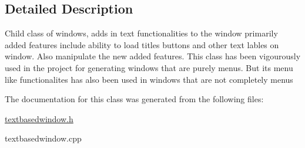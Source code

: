 \subsection{Detailed Description}
Child class of windows, adds in text functionalities to the window primarily added features include ability to load titles buttons and other text lables on window. Also manipulate the new added features. This class has been vigourously used in the project for generating windows that are purely menus. But its menu like functionalites has also been used in windows that are not completely menus 

The documentation for this class was generated from the following files\+:\begin{DoxyCompactItemize}
\item 
\hyperlink{textbasedwindow_8h}{textbasedwindow.\+h}\item 
textbasedwindow.\+cpp\end{DoxyCompactItemize}
